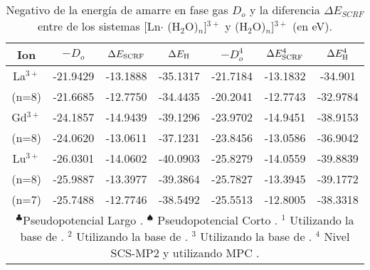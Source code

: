 \begin{table}[h!]
\centering
\caption{\footnotesize Negativo de la energ\'ia de amarre en fase gas
$D_o$ y la diferencia $\Delta E_{SCRF}$ entre de los sistemas [Ln$\cdot$
(H$_2$O)$_{n}$]$^{3+}$ y (H$_2$O)$_{n}$]$^{3+}$ (en eV).}
\begin{tabular}{c|cccccc}\hline\hline
Ion & $-D_o$ & $\Delta E_{\mbox{{\scriptsize SCRF}}}$ & 
$\Delta E_{\mbox{{\scriptsize H}}} $ 
& $-D_o^4$ & $\Delta E_{\mbox{{\scriptsize SCRF}}}^4$ & 
$\Delta E_{\mbox{{\scriptsize H}}}^4 $ \\ \hline
La$^{3+}$ &-21.9429 &-13.1888 &-35.1317 &-21.7184 &-13.1832 &-34.901\\ 
 (n=8)    &-21.6685 &-12.7750 &-34.4435 &-20.2041 &-12.7743 &-32.9784\\
Gd$^{3+}$ &-24.1857 &-14.9439 &-39.1296 &-23.9702 &-14.9451 &-38.9153\\ 
 (n=8)    &-24.0620 &-13.0611 &-37.1231 &-23.8456 &-13.0586 &-36.9042\\
Lu$^{3+}$ &-26.0301 &-14.0602 &-40.0903 &-25.8279 &-14.0559 &-39.8839\\ 
 (n=8)    &-25.9887 &-13.3977 &-39.3864 &-25.7827 &-13.3945 &-39.1772\\
 (n=7)    &-25.7488 &-12.7746 &-38.5492 &-25.5513 &-12.8005 &-38.3318\\
\hline 
\multicolumn{7}{p{11.0cm}}{
{\footnotesize $^\clubsuit$Pseudopotencial Largo \citep{Dolg1989}. 
$^\spadesuit$ Pseudopotencial Corto \citep{Cao2001}}.
{\footnotesize $^1$ Utilizando la base de \cite{Dolg1993}.} 
{\footnotesize $^2$ Utilizando la base de \cite{Yang2005}.}
{\footnotesize $^3$ Utilizando la base de \cite{Cao2002}.}  
{\footnotesize $^4$ Nivel SCS-MP2 \citep{Grim2003} y utilizando MPC 
\citep{Toma2005}.}}
\end{tabular}\label{tEB}\end{table}
